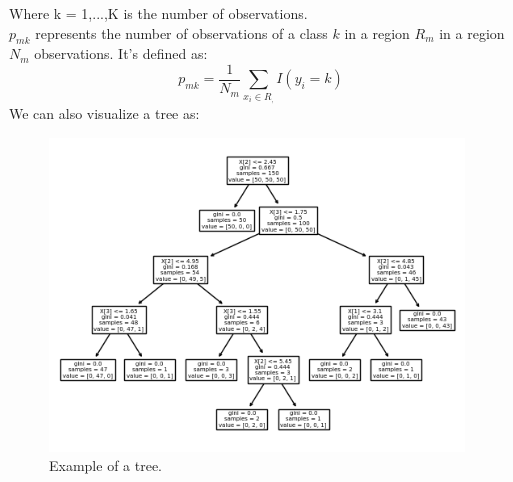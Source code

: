 \documentclass[letterpaper,12pt]{article}
\begin{document}
Where k = 1,...,K is the number of observations.\\
$p_{mk}$ represents the number of observations of a class $k$ in a region $R_m$ in a region $N_m$ observations. It's defined as:
    \begin{equation}
        p_{mk} = \frac{1}{N_m}\sum_{x_i \in R_,} I(y_i = k)
    \end{equation}
We can also visualize a tree as:
\begin{figure}[H]
    \centering
    \includegraphics[width=11cm]{TREEex.png}
    \caption{\centering Example of a tree. \cite{lecnotes}}
    \label{cross}
\end{figure}
\end{document}
